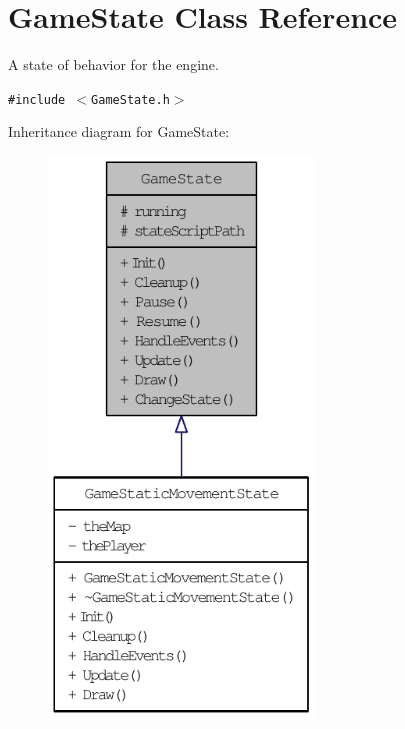 \hypertarget{class_game_state}{
\section{GameState Class Reference}
\label{dd/d87/class_game_state}
}
A state of behavior for the engine.  


{\tt \#include $<$GameState.h$>$}

Inheritance diagram for GameState:\nopagebreak
\begin{figure}[H]
\begin{center}
\leavevmode
\includegraphics[width=200pt]{d8/d0b/class_game_state__inherit__graph}
\end{center}
\end{figure}
